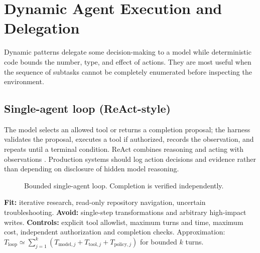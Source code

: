 
\section{Dynamic Agent Execution and Delegation}
Dynamic patterns delegate some decision-making to a model while deterministic code bounds the number, type, and effect of actions. They are most useful when the sequence of subtasks cannot be completely enumerated before inspecting the environment.

\subsection{Single-agent loop (ReAct-style)}
The model selects an allowed tool or returns a completion proposal; the harness validates the proposal, executes a tool if authorized, records the observation, and repeats until a terminal condition. ReAct combines reasoning and acting with observations \cite{react}. Production systems should log action decisions and evidence rather than depending on disclosure of hidden model reasoning.

\begin{figure}[htbp]\centering
{}
\caption{Bounded single-agent loop. Completion is verified independently.}
\label{fig:react}
\end{figure}

\textbf{Fit:} iterative research, read-only repository navigation, uncertain troubleshooting. \textbf{Avoid:} single-step transformations and arbitrary high-impact writes. \textbf{Controls:} explicit tool allowlist, maximum turns and time, maximum cost, independent authorization and completion checks. Approximation: $T_{\mathrm{loop}}\simeq\sum_{j=1}^{k}(T_{\mathrm{model},j}+T_{\mathrm{tool},j}+T_{\mathrm{policy},j})$ for bounded $k$ turns.


